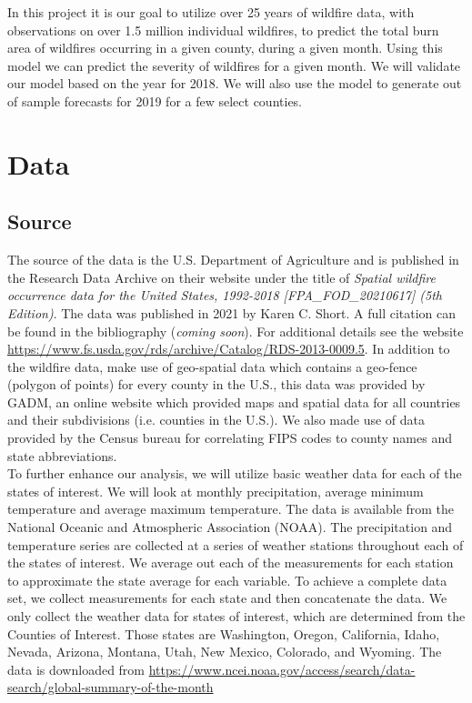 \documentclass[12pt]{article}
\begin{document}
In this project it is our goal to utilize over 25 years of wildfire data, with observations on over 1.5 million individual wildfires, to predict the total burn area of wildfires occurring in a given county, during a given month. Using this model we can predict the severity of wildfires for a given month. We will validate our model based on the year for 2018. We will also use the model to generate out of sample forecasts for 2019 for a few select counties. 

\section{\textrm{ \LARGE Data}} 

\subsection{\textrm{Source}}

The source of the data is the U.S. Department of Agriculture and is published in the Research Data Archive on their website under the title of \textit{Spatial wildfire occurrence data for the United States, 1992-2018 [FPA\_FOD\_20210617] (5th Edition)}. The data was published in 2021 by Karen C. Short. A full citation can be found in the bibliography (\textit{coming soon}). For additional details see the website \url{https://www.fs.usda.gov/rds/archive/Catalog/RDS-2013-0009.5}. In addition to the wildfire data, make use of geo-spatial data which contains a geo-fence (polygon of points) for every county in the U.S., this data was provided by GADM, an online website which provided maps and spatial data for all countries and their subdivisions (i.e. counties in the U.S.). We also made use of data provided by the Census bureau for correlating FIPS codes to county names and state abbreviations. \\

To further enhance our analysis, we will utilize basic weather data for each of the states of interest. We will look at monthly precipitation, average minimum temperature and average maximum temperature. The data is available from the National Oceanic and Atmospheric Association (NOAA). The precipitation and temperature series are collected at a series of weather stations throughout each of the states of interest. We average out each of the measurements for each station to approximate the state average for each variable. To achieve a complete data set, we collect measurements for each state and then concatenate the data. We only collect the weather data for states of interest, which are determined from the Counties of Interest. Those states are Washington, Oregon, California, Idaho, Nevada, Arizona, Montana, Utah, New Mexico, Colorado, and Wyoming. The data is downloaded from \url{https://www.ncei.noaa.gov/access/search/data-search/global-summary-of-the-month}
\end{document}
